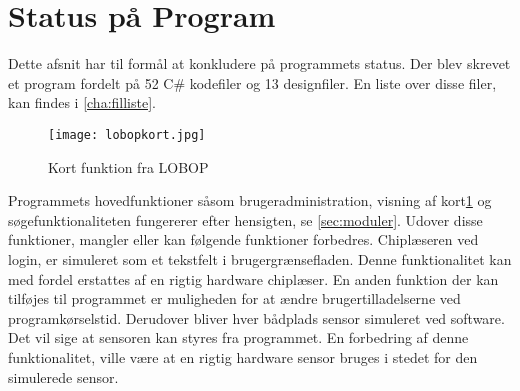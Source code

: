 \newpage
\section{Status på Program} 
\label{sec:status_p_program}



Dette afsnit har til formål at konkludere på programmets status. Der blev skrevet et program fordelt på 52 C\# kodefiler og 13 designfiler. En liste over disse filer, kan findes i \cref{cha:filliste}. 

\begin{figure}
  \texttt{[image: lobopkort.jpg]}
  \caption{Kort funktion fra LOBOP}
  \label{fig:lobopkort}
\end{figure}


Programmets hovedfunktioner såsom brugeradministration, visning af kort\cref{fig:lobopkort} og søgefunktionaliteten fungererer efter hensigten, se \cref{sec:moduler}. Udover disse funktioner, mangler eller kan følgende funktioner forbedres. Chiplæseren ved login, er simuleret som et tekstfelt i brugergrænsefladen. Denne funktionalitet kan med fordel erstattes af en rigtig hardware chiplæser. En anden funktion der kan tilføjes til programmet er muligheden for at ændre brugertilladelserne ved programkørselstid. Derudover bliver hver bådplads sensor simuleret ved software. Det vil sige at sensoren kan styres fra programmet. En forbedring af denne funktionalitet, ville være at en rigtig hardware sensor bruges i stedet for den simulerede sensor.




